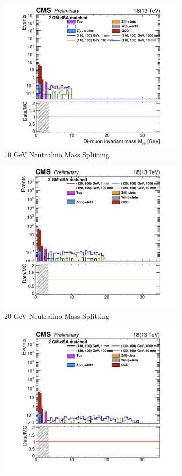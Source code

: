 \documentclass{article}
\begin{document}
\begin{figure} [H]
\begin{subfigure}{.5\textwidth}
  \centering
  \includegraphics[width=.8\linewidth]{Split10.png}  
  \caption{10 GeV Neutralino Mass Splitting}
  \label{fig:sub-first18}
\end{subfigure}
\begin{subfigure}{.5\textwidth}
  \centering
  \includegraphics[width=.8\linewidth]{Split20.png}  
  \caption{20 GeV Neutralino Mass Splitting}
  \label{fig:sub-second18}
\end{subfigure}
\begin{subfigure}{.5\textwidth}
  \centering
  \includegraphics[width=.8\linewidth]{Split30.png}  

\end{subfigure}
\end{figure}
\end{document}
